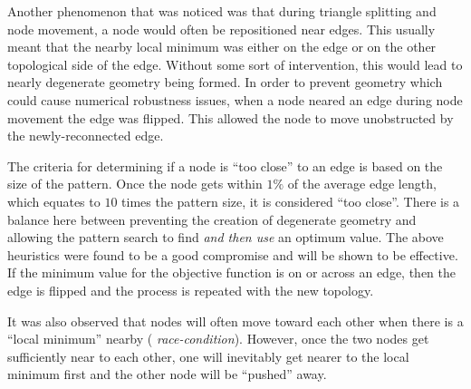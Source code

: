 Another phenomenon that was noticed was that during
triangle splitting and node movement, a node would often be repositioned
near edges. This usually meant that the nearby local minimum was either
on the edge or on the other topological side of the edge. Without some
sort of intervention, this would lead to nearly degenerate geometry
being formed. In order to prevent geometry which could cause numerical
robustness issues, when a node neared an edge during node movement the
edge was flipped. This allowed the node to move unobstructed by the
newly-reconnected edge.

The criteria for determining if a node is ``too close'' to an edge is
based on the size of the pattern. Once the node gets within $1\%$ of the
average edge length, which equates to $10$ times the pattern size, it is
considered ``too close''. There is a balance here between preventing the
creation of degenerate geometry and allowing the pattern search to find
{\it and then use} an optimum value. The above heuristics were found to
be a good compromise and will be shown to be effective. If the minimum
value for the objective function is on or across an edge, then the edge
is flipped and the process is repeated with the new topology.

It was also observed that nodes will often move toward
each other when there is a ``local minimum'' nearby ({\it
race-condition}).  However, once the two nodes get sufficiently near to
each other, one will inevitably get nearer to the local minimum first
and the other node will be ``pushed'' away.
